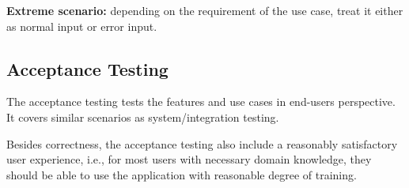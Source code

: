 \textbf{Extreme scenario:} depending on the requirement of the use case, treat it either as
normal input or error input.

\subsection{Acceptance Testing}

The acceptance testing tests the features and use cases in end-users perspective. It covers similar scenarios as system/integration testing. 

Besides correctness, the acceptance testing also include a reasonably satisfactory user experience, i.e., for most users with necessary domain knowledge, they should be able to use the application with reasonable degree of training.
